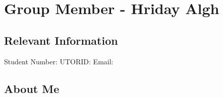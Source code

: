 \documentclass{article}
\begin{document}
\noindent\makebox[\linewidth]{\rule{\paperwidth}{0.4pt}}

\section{Group Member - Hriday Algh}
\subsection{Relevant Information}
    Student Number:  \newline
    UTORID:  \newline
    Email: 
\subsection{About Me}
\end{document}
